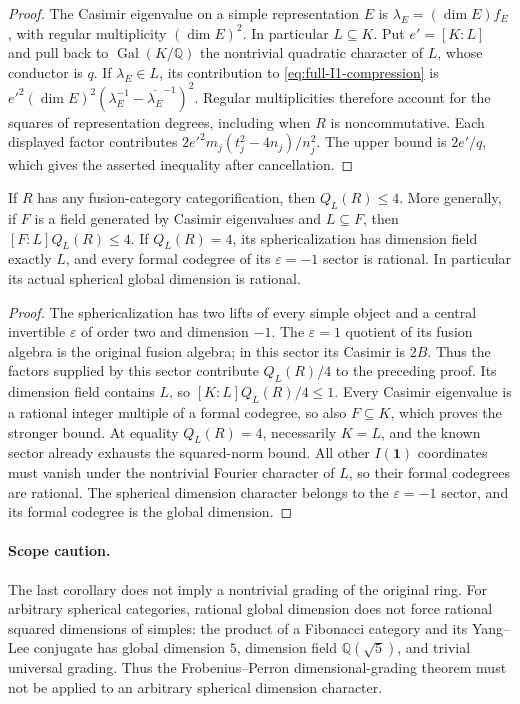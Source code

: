 \begin{proof}
The Casimir eigenvalue on a simple representation $E$ is
$\lambda_E=(\dim E)f_E$, with regular multiplicity $(\dim E)^2$.
In particular $L\subseteq K$.  Put $e'=[K:L]$ and pull back to
$\operatorname{Gal}(K/\mathbb Q)$ the nontrivial quadratic character of
$L$, whose conductor is $q$.  If $\lambda_E\in L$, its contribution to
\eqref{eq:full-I1-compression} is
$e'^2(\dim E)^2(\lambda_E^{-1}-\overline{\lambda_E}^{-1})^2$.
Regular multiplicities therefore account for the squares of representation
degrees, including when $R$ is noncommutative.  Each displayed factor
contributes $2e'^2m_j(t_j^2-4n_j)/n_j^2$.  The upper bound is $2e'/q$,
which gives the asserted inequality after cancellation.
\end{proof}

\begin{corollary}
If $R$ has any fusion-category categorification, then $Q_L(R)\leq4$.
More generally, if $F$ is a field generated by Casimir eigenvalues and
$L\subseteq F$, then $[F:L]Q_L(R)\leq4$.
If $Q_L(R)=4$, its sphericalization has dimension field exactly $L$,
and every formal codegree of its $\varepsilon=-1$ sector is rational.
In particular its actual spherical global dimension is rational.
\end{corollary}

\begin{proof}
The sphericalization has two lifts of every simple object and a central
invertible $\varepsilon$ of order two and dimension $-1$.
The $\varepsilon=1$ quotient of its fusion algebra is the original fusion
algebra; in this sector its Casimir is $2B$.  Thus the factors supplied by
this sector contribute $Q_L(R)/4$ to the preceding proof.  Its dimension
field contains $L$, so $[K:L]Q_L(R)/4\leq1$.
Every Casimir eigenvalue is a rational integer multiple of a formal
codegree, so also $F\subseteq K$, which proves the stronger bound.
At equality $Q_L(R)=4$, necessarily $K=L$, and the known sector already
exhausts the squared-norm bound.  All other $I(\mathbf1)$ coordinates must
vanish under the nontrivial Fourier character of $L$, so their formal
codegrees are rational.  The spherical dimension character belongs to the
$\varepsilon=-1$ sector, and its formal codegree is the global dimension.
\end{proof}

\paragraph{Scope caution.}
The last corollary does not imply a nontrivial grading of the original
ring.  For arbitrary spherical categories, rational global dimension
does not force rational squared dimensions of simples: the product of a
Fibonacci category and its Yang--Lee conjugate has global dimension $5$,
dimension field $\mathbb Q(\sqrt5)$, and trivial universal grading.
Thus the Frobenius--Perron dimensional-grading theorem must not be applied
to an arbitrary spherical dimension character.


